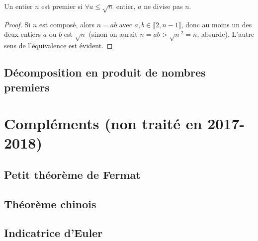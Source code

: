 \begin{proposition}
Un entier $n$ est premier si $\forall a \leq \sqrt n$ entier, $a$ ne divise pas $n$.
\end{proposition}
\begin{proof}
Si $n$ est composé, alors $n=ab$ avec $a, b \in \llbracket 2,n-1 \rrbracket$, donc au moins un des deux entiers $a$ ou $b$ est $\sqrt n$ (sinon on aurait $n=ab > \sqrt{n}^2=n$, absurde). L'autre sens de l'équivalence est évident.
\end{proof}



\subsection{Décomposition en produit de nombres premiers}



\section{Compléments (non traité en 2017-2018)}
\subsection{Petit théorème de Fermat}
\subsection{Théorème chinois}
\subsection{Indicatrice d'Euler}
